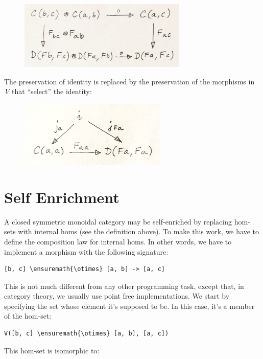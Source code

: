 \begin{figure}[H]
\centering
\includegraphics[width=80mm]{images/functorcomp.jpg}
\end{figure}

\noindent
The preservation of identity is replaced by the preservation of the
morphisms in \emph{V} that ``select'' the identity:

\begin{figure}[H]
\centering
\includegraphics[width=70mm]{images/functorid.jpg}
\end{figure}

\section{Self Enrichment}\label{self-enrichment}

A closed symmetric monoidal category may be self-enriched by replacing
hom-sets with internal homs (see the definition above). To make this
work, we have to define the composition law for internal homs. In other
words, we have to implement a morphism with the following signature:

\begin{Verbatim}[commandchars=\\\{\}]
[b, c] \ensuremath{\otimes} [a, b] -> [a, c]
\end{Verbatim}
This is not much different from any other programming task, except that,
in category theory, we usually use point free implementations. We start
by specifying the set whose element it's supposed to be. In this case,
it's a member of the hom-set:

\begin{Verbatim}[commandchars=\\\{\}]
V([b, c] \ensuremath{\otimes} [a, b], [a, c])
\end{Verbatim}
This hom-set is isomorphic to:

